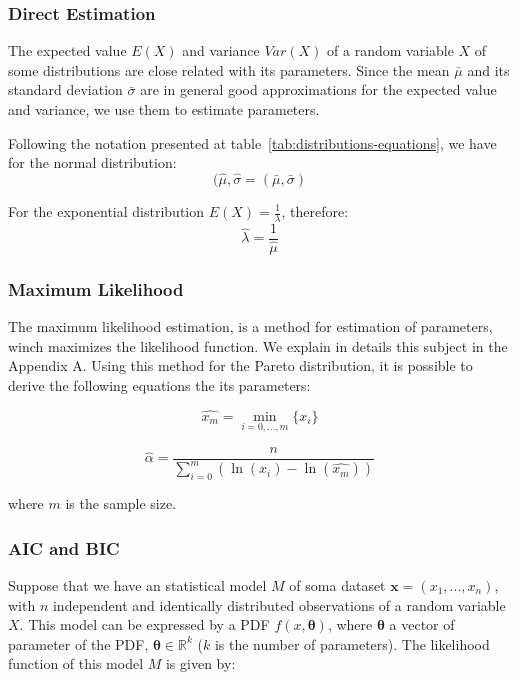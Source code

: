 \subsubsection{Direct Estimation}

The expected value $E(X)$ and variance $Var(X)$ of a random variable $X$ of some distributions are close related with its parameters. Since the mean $\bar{\mu}$ and its standard deviation $\bar{\sigma}$ are in general good approximations for the expected value and variance, we use them to estimate parameters.

Following the notation presented at table~\ref{tab:distributions-equations}, we have for the normal distribution:
\begin{equation}
(\hat{\mu}, \hat{\sigma} = (\bar{\mu}, \bar{\sigma})
\end{equation}

For the exponential distribution $E(X) = \frac{1}{\lambda}$, therefore:
\begin{equation}
\hat{\lambda} = \frac{1}{\hat{\mu}}
\end{equation} 

\subsubsection{Maximum Likelihood}

The maximum likelihood estimation, is a method for estimation of parameters, winch maximizes the likelihood function. We explain in details this subject in the Appendix A. Using this method for the Pareto distribution, it is possible to derive the following equations the its parameters:

\begin{equation}
\hat{x_{m}} = \min_{i = 0, ..., m}\{x_{i}\}
\end{equation} 

\begin{equation}
\hat{\alpha} = \frac{n}{ \sum_{i = 0}^{m}(\ln{(x_{i}) - \ln(\hat{x_{m}})})  }
\end{equation} 

where $m$ is the sample size.


\subsubsection{AIC and BIC}

 Suppose that we have an statistical model $M$ of soma dataset ${\boldsymbol{x} = (x_1, ..., x_n)}$, with $n$ independent and identically distributed observations of a random variable $X$. This model can be expressed by a PDF $f(x, \boldsymbol{\theta})$, where $\boldsymbol{\theta}$ a vector of parameter of the PDF, $\boldsymbol{\theta} \in \mathbb{R}^{k}$ ($k$ is the number of parameters). The  likelihood function  of this model $M$ is given by:

